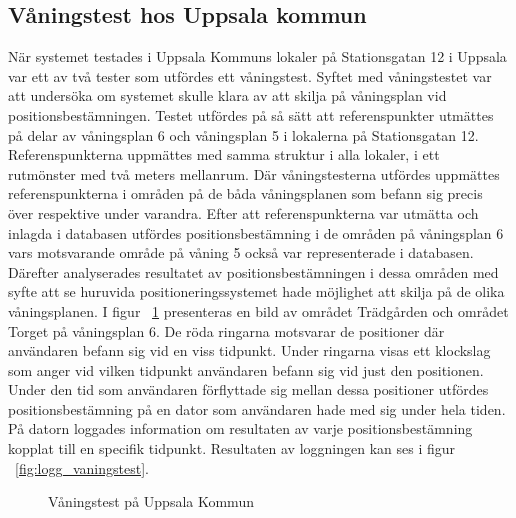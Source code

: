 \documentclass[a4paper,12pt]{article}
\begin{document}
 \subsection{Våningstest hos Uppsala kommun}\label{vaningstest}
 När systemet testades i Uppsala Kommuns lokaler på Stationsgatan 12 i Uppsala var ett av två tester som utfördes ett våningstest. Syftet med våningstestet var att undersöka om systemet skulle klara av att skilja på våningsplan vid positionsbestämningen. Testet utfördes på så sätt att referenspunkter utmättes på delar av våningsplan 6 och våningsplan 5 i lokalerna på Stationsgatan 12. Referenspunkterna uppmättes med samma struktur i alla lokaler, i ett rutmönster med två meters mellanrum. Där våningstesterna utfördes uppmättes referenspunkterna i områden på de båda våningsplanen som befann sig precis över respektive under varandra. Efter att referenspunkterna var utmätta och inlagda i databasen utfördes positionsbestämning i de områden på våningsplan 6 vars motsvarande område på våning 5 också var representerade i databasen. Därefter analyserades resultatet av positionsbestämningen i dessa områden med syfte att se huruvida positioneringssystemet hade möjlighet att skilja på de olika våningsplanen. I figur ~\ref{fig:vanings_test} presenteras en bild av området Trädgården och området Torget på våningsplan 6. De röda ringarna motsvarar de positioner där användaren befann sig vid en viss tidpunkt. Under ringarna visas ett klockslag som anger vid vilken tidpunkt användaren befann sig vid just den positionen. Under den tid som användaren förflyttade sig mellan dessa positioner utfördes positionsbestämning på en dator som användaren hade med sig under hela tiden. På datorn loggades information om resultaten av varje positionsbestämning kopplat till en specifik tidpunkt. Resultaten av loggningen kan ses i figur ~\ref{fig:logg_vaningstest}.

 \begin{figure}[H]
   \centering
   \caption{Våningstest på Uppsala Kommun}
   \label{fig:vanings_test}
 \end{figure}
\end{document}
